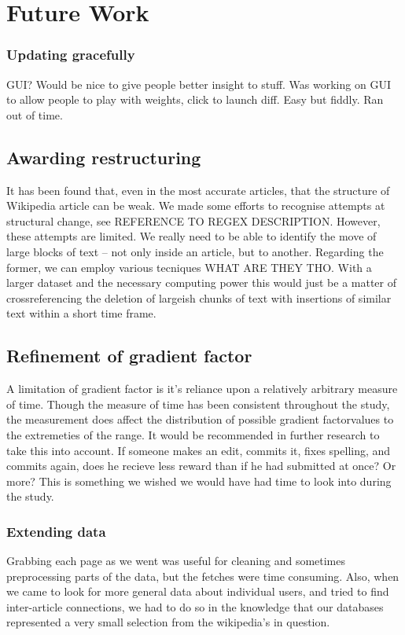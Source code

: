 \section{Future Work}
\subsubsection*{Updating gracefully}
GUI? Would be nice to give people better insight to stuff. Was working
on GUI to allow people to play with weights, click to launch
diff. Easy but fiddly. Ran out of time.

\subsection*{Awarding restructuring}
\label{restructuring}
It has been found that, even in the most accurate articles, that the
structure of Wikipedia article can be weak.\cite{Giles2005} We made
some efforts to recognise attempts at structural change, see REFERENCE
TO REGEX DESCRIPTION. However, these attempts are limited. We really
need to be able to identify the move of large blocks of text -- not
only inside an article, but to another. Regarding the former, we can
employ various tecniques WHAT ARE THEY THO. With a larger dataset and the
necessary computing power this would just be a matter of
crossreferencing the deletion of largeish chunks of text with
insertions of similar text within a short time frame.

\subsection*{Refinement of gradient factor}
A limitation of gradient factor is it's reliance upon a relatively
arbitrary measure of time. Though the measure of time has been
consistent throughout the study, the measurement does affect the
distribution of possible gradient factorvalues to the extremeties of
the range. It would be recommended in further research to take this
into account. If someone makes an edit, commits it, fixes spelling,
and commits again, does he recieve less reward than if he had
submitted at once? Or more? This is something we wished we would have
had time to look into during the study.

\subsubsection*{Extending data}
Grabbing each page as we went was useful for cleaning and sometimes
preprocessing parts of the data, but the fetches were time
consuming. Also, when we came to look for more general data about
individual users, and tried to find inter-article connections, we had
to do so in the knowledge that our databases represented a very small
selection from the wikipedia's in question.

